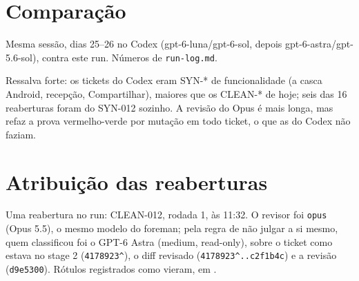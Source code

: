 \documentclass[11pt,a4paper]{article}
\begin{document}
\section{Comparação}

Mesma sessão, dias 25--26 no Codex (gpt-6-luna/gpt-6-sol, depois
gpt-6-astra/gpt-5.6-sol), contra este run. Números de \texttt{run-log.md}.

\medskip
{}

\medskip
Ressalva forte: os tickets do Codex eram SYN-* de funcionalidade (a casca
Android, recepção, Compartilhar), maiores que os CLEAN-* de hoje; seis das 16
reaberturas foram do SYN-012 sozinho. A revisão do Opus é mais longa, mas
refaz a prova vermelho-verde por mutação em todo ticket, o que as do Codex
não faziam.

\section{Atribuição das reaberturas}

Uma reabertura no run: CLEAN-012, rodada 1, às 11:32. O revisor foi
\texttt{opus} (Opus 5.5), o mesmo modelo do foreman; pela regra de não julgar
a si mesmo, quem classificou foi o GPT-6 Astra (medium, read-only), sobre o
ticket como estava no stage 2 (\texttt{4178923\^{}}), o diff revisado
(\texttt{4178923\^{}..c2f1b4c}) e a revisão (\texttt{d9e5300}). Rótulos
registrados como vieram, em .

\medskip
{}
\end{document}
